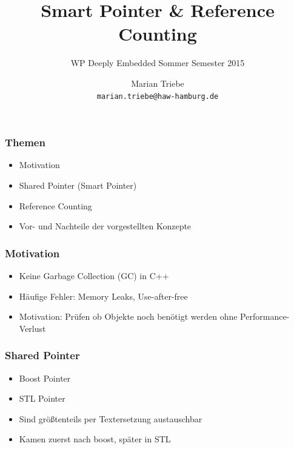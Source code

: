 \documentclass{beamer}
\title{Smart Pointer \& Reference Counting}
\author{
  Marian Triebe\\
  \tiny \texttt{marian.triebe@haw-hamburg.de}
}
\date{} %
\subtitle{WP Deeply Embedded Sommer Semester 2015}
\begin{document}
\begin{frame}
 \titlepage
\end{frame}
 
\begin{frame}
 \frametitle{Themen}
 \begin{itemize}
  \item Motivation
  \item Shared Pointer (Smart Pointer)
  \item Reference Counting
  \item Vor- und Nachteile der vorgestellten Konzepte
 \end{itemize}
\end{frame}

\begin{frame}
 \frametitle{Motivation}
 \begin{itemize}
 	\item Keine Garbage Collection (GC) in C++
 	\item Häufige Fehler: Memory Leaks, Use-after-free
 	\item Motivation: Prüfen ob Objekte noch benötigt werden ohne
 	Performance-Verlust
 \end{itemize}
\end{frame}


\begin{frame}
 \frametitle{Shared Pointer}
 \begin{itemize}
  \item Boost Pointer
  \item STL Pointer
  \item Sind größtenteils per Textersetzung austauschbar
  \item Kamen zuerst nach boost, später in STL
 \end{itemize}
\end{frame}

\end{document}
